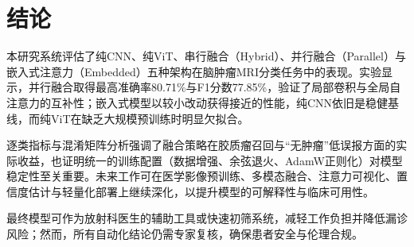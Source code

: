 \section{结论}

本研究系统评估了纯CNN、纯ViT、串行融合（Hybrid）、并行融合（Parallel）与嵌入式注意力（Embedded）五种架构在脑肿瘤MRI分类任务中的表现。实验显示，并行融合取得最高准确率80.71\%与F1分数77.85\%，验证了局部卷积与全局自注意力的互补性；嵌入式模型以较小改动获得接近的性能，纯CNN依旧是稳健基线，而纯ViT在缺乏大规模预训练时明显欠拟合。

逐类指标与混淆矩阵分析强调了融合策略在胶质瘤召回与“无肿瘤”低误报方面的实际收益，也证明统一的训练配置（数据增强、余弦退火、AdamW正则化）对模型稳定性至关重要。未来工作可在医学影像预训练、多模态融合、注意力可视化、置信度估计与轻量化部署上继续深化，以提升模型的可解释性与临床可用性。

最终模型可作为放射科医生的辅助工具或快速初筛系统，减轻工作负担并降低漏诊风险；然而，所有自动化结论仍需专家复核，确保患者安全与伦理合规。
